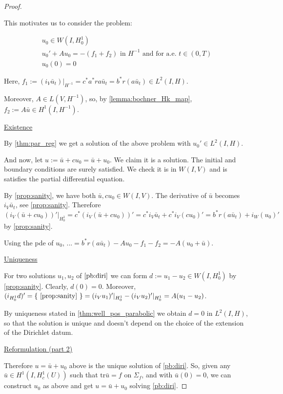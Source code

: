 \documentclass[english,a4paper,12pt,oneside]{scrbook}
\theoremstyle{break}
\newenvironment{mproof}[1][\proofname]{%
  \begin{proof}[#1]$ $\par\nobreak\ignorespaces
}{%
  \end{proof}
}
\renewcommand*{\proofname}{Proof}
\theoremstyle{remark}
\newcommand{\tr}{\text{tr}}
\newcommand{\ind}[1]{\{\text{ #1 }\}}
\begin{document}
\begin{mproof}
This motivates us to consider the problem: 

\begin{align}
u_0 \in W(I,H^1_0) \\
u_0' + A u_0 = -(f_1+f_2) \text{ in }H^{-1} \text{ and for a.e. } t \in (0,T) \\
u_0(0)=0
\end{align}

Here, $f_1:=(i_V\bar{u}_t)|_{H^{-1}}=c^*a^*ra\bar{u}_t = b^*r (a\bar{u}_t) \in L^2(I,H)$.

Moreover, $A \in L(V, H^{-1})$, so, by \cref{lemma:bochner_Hk_map}, $f_2:=A\bar{u} \in H^1(I, H^{-1})$.

\underline{Existence}

By \cref{thm:par_reg} we get a solution of the above problem with $u_0' \in L^2(I, H)$.

And now, let $u:=\bar{u}+c u_0 =\bar{u}+ u_0 $. We claim it is a solution. The initial and boundary conditions are surely satisfied. We check it is in $W(I,V)$ and is satisfies the partial differential equation.

By \cref{prop:sanity}, we have both $\bar{u}, c u_0 \in W(I,V)$. The derivative of $\bar{u}$ becomes $i_V \bar{u}_t$, see \cref{prop:sanity}. Therefore $(i_V(\bar{u}+c u_0))'|_{H^1_0} = c^* (i_V(\bar{u}+c u_0))' = c^*i_V \bar{u}_t + c^*i_V(c u_0)' = b^*r (a\bar{u}_t) + i_W(u_0)'$ by \cref{prop:sanity}.

Using the pde of $u_0$, $... = b^*r (a\bar{u}_t) - Au_0 -f_1 -f_2 = -A(u_0+\bar{u})$.

\underline{Uniqueness}

For two solutions $u_1, u_2$ of $\ref{pb:diri}$ we can form $d:=u_1-u_2\in W(I,H^1_0)$ by \cref{prop:sanity}. Clearly, $d(0)=0$. Moreover, $(i_{H^1_0} d)' = \ind{\cref{prop:sanity}}=(i_V u_1)'|_{H^1_0}-(i_V u_2)'|_{H^1_0} = A(u_1-u_2)$.

By uniqueness stated in \cref{thm:well_pos_parabolic} we obtain $d=0$ in $L^2(I,H)$, so that the solution is unique and doesn't depend on the choice of the extension of the Dirichlet datum.

\underline{Reformulation (part 2)}

Therefore $u=\bar{u}+u_0$ above is the unique solution of \cref{pb:diri}. So, given any $\bar{u}\in H^1(I,H^1_c(U))$ such that $\tr \bar{u} =f$ on $\Sigma_f$, and with $\bar{u}(0)=0$, we can construct $u_0$ as above and get $u=\bar{u}+u_0$ solving \cref{pb:diri}.


\end{mproof}
\end{document}
